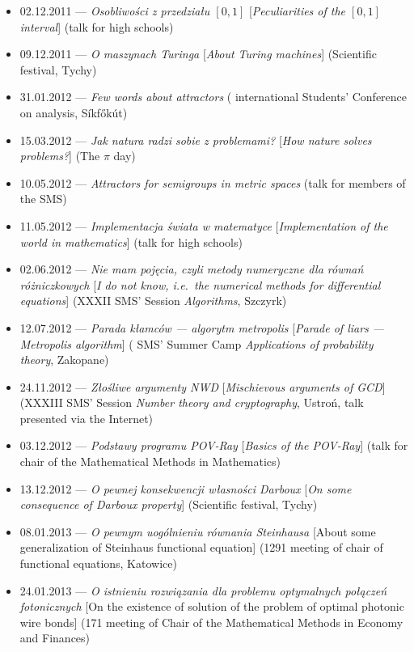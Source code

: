 \begin{itemize}
  \item 02.12.2011 --- \textsl{Osobliwości z przedziału $[0, 1]$} [\textsl{Peculiarities of the $[0,1]$ interval}] (talk for high schools)
  \item 09.12.2011 --- \textsl{O maszynach Turinga} [\textsl{About Turing machines}] (Scientific festival, Tychy)
  \item 31.01.2012 --- \textsl{Few words about attractors} ( international Students' Conference on analysis, Síkfőkút)
  \item 15.03.2012 --- \textsl{Jak natura radzi sobie z problemami?} [\textsl{How nature solves problems?}] (The $\pi$ day)
  \item 10.05.2012 --- \textsl{Attractors for semigroups in metric spaces} (talk for members of the SMS)
  \item 11.05.2012 --- \textsl{Implementacja świata w matematyce} [\textsl{Implementation of the world in mathematics}] (talk for high schools)
  \item 02.06.2012 --- \textsl{Nie mam pojęcia, czyli metody numeryczne dla równań różniczkowych} [\textsl{I do not know, i.e.\ the numerical methods for differential equations}] (XXXII SMS' Session \textsl{Algorithms}, Szczyrk)
  \item 12.07.2012 --- \textsl{Parada kłamców --- algorytm metropolis} [\textsl{Parade of liars ---  Metropolis algorithm}] ( SMS' Summer Camp \textsl{Applications of probability theory}, Zakopane)
  \item 24.11.2012 --- \textsl{Złośliwe argumenty NWD} [\textsl{Mischievous arguments of GCD}] (XXXIII SMS' Session \textsl{Number theory and cryptography}, Ustroń, talk presented via the Internet)
  \item 03.12.2012 --- \textsl{Podstawy programu POV-Ray} [\textsl{Basics of the POV-Ray}] (talk for chair of the Mathematical Methods in Mathematics)
  \item 13.12.2012 --- \textsl{O pewnej konsekwencji własności Darboux} [\textsl{On some consequence of Darboux property}] (Scientific festival, Tychy)
  \item 08.01.2013 --- \textsl{O pewnym uogólnieniu równania Steinhausa} [About some generalization of Steinhaus functional equation] (1291 meeting of chair of functional equations, Katowice)
  \item 24.01.2013 --- \textsl{O istnieniu rozwiązania dla problemu optymalnych połączeń fotonicznych} [On the existence of solution of the problem of optimal photonic wire bonds] (171 meeting of Chair of the Mathematical Methods in Economy and Finances)

\end{itemize}
